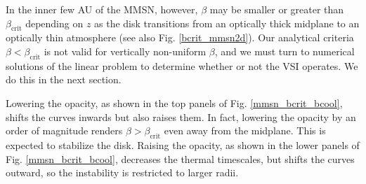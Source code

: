 {In the inner few AU of the MMSN, however, $\beta$ 
may be smaller or greater than $\beta_\mathrm{crit}$ depending on
$z$ as the disk transitions from an optically thick midplane to an
optically thin atmosphere (see also Fig. \ref{bcrit_mmsn2d}). 
Our analytical criteria $\beta < \beta_\mathrm{crit}$ is not valid for
vertically non-uniform $\beta$, and we must turn to numerical
solutions of the linear problem to determine whether or not the VSI
operates. We do this in the next section.    
 
Lowering the opacity, as shown in the top panels of
Fig. \ref{mmsn_bcrit_bcool}, shifts the curves inwards but also raises
them. In fact, lowering the opacity by an order of magnitude renders  
$\beta > \beta_\mathrm{crit}$ even away from the midplane. This is 
expected to stabilize the disk. Raising the opacity, as shown in 
the lower panels of Fig. \ref{mmsn_bcrit_bcool}, decreases the thermal
timescales, but shifts the curves outward, so the instability is
restricted to larger radii.  

}
